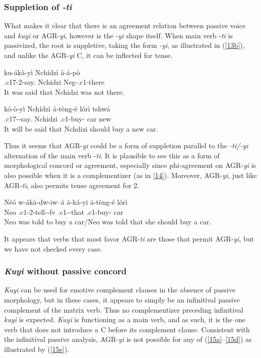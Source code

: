 \documentclass[output=paper,
modfonts
]{langscibook}
\begin{document}
\subsubsection{Suppletion of \textit{-ti}}

What makes it clear that there is an agreement relation between passive voice and \textit{kuyi} or AGR-\textit{yi}, however is the -\textit{yi} shape itself. When main verb -\textit{ti} is passivized, the root is suppletive, taking the form -\textit{yi}, as illustrated in (\ref{13b}), and unlike the AGR-\textit{yi} C, it can be inflected for tense.

\ea
\ea \gll ku-ákà-yì Nchídzì à-á-pò\\
	.c17-2-say. Nchidzi	Neg-.c1-there\\
	\glt It was said that Nchidzi was not there.

\ex \label{13b} \gll kó-ò-yì Nchídzì	á-tèng-è lórì tshwá\\
	.c17--say.	Nchidzi	.c1-buy-	car	new\\
     \glt It will be said that Nchdizi should buy a new car. \z \z

Thus it seems that AGR-\textit{yi} could be a form of suppletion parallel to the \textit{-ti/-yi} alternation of the main verb -\textit{ti}. It is plausible to see this as a form of morphological concord or agreement, especially since phi-agreement on AGR-\textit{yi} is also possible when it is a complementizer (as in \ref{14}). Moreover, AGR-\textit{yi}, just like AGR-\textit{ti}, also permits tense agreement for 2.  

\ea\label{14} \gll Néó	w-ákà-dw-iw–á á-ká-yì á-tèng-é lórì\\
	Neo	.c1-2-tell--fv  .c1--that .c1-buy-	car\\
	\glt Neo was told to buy a car\slash Neo was told that she should buy a car. \z

It appears that verbs that most favor AGR-\textit{ti} are those that permit AGR-\textit{yi}, but we have not checked every case.

\subsubsection{\textit{Kuyi} without passive concord}

\textit{Kuyi} can be used for emotive complement clauses in the absence of passive morphology, but in these cases, it appears to simply be an infinitival passive complement of the matrix verb. Thus no complementizer preceding infinitival \textit{kuyi} is expected. \textit{Kuyi} is functioning as a main verb, and as such, it is the one verb that does not introduce a C before its complement clause. Consistent with the infinitival passive analysis, AGR-\textit{yi} is not possible for any of (\ref{15a}--\ref{15d}) as illustrated by (\ref{15e}). %
\end{document}
